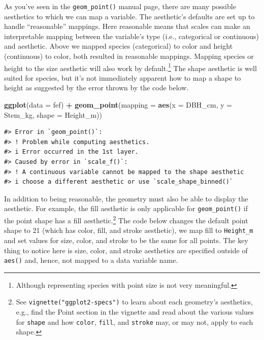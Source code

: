 \documentclass[
  11pt,
]{krantz}
\newenvironment{Shaded}{\begin{snugshade}}{\end{snugshade}}
\newcommand{\DataTypeTok}[1]{\textcolor[rgb]{0.13,0.29,0.53}{#1}}
\newcommand{\KeywordTok}[1]{\textcolor[rgb]{0.13,0.29,0.53}{\textbf{#1}}}
\newcommand{\NormalTok}[1]{#1}
\newcommand{\OperatorTok}[1]{\textcolor[rgb]{0.81,0.36,0.00}{\textbf{#1}}}
\newcommand{\StringTok}[1]{\textcolor[rgb]{0.31,0.60,0.02}{#1}}
\theoremstyle{definition}
\theoremstyle{definition}
\theoremstyle{definition}
\theoremstyle{definition}
\theoremstyle{remark}
\begin{document}
As you've seen in the \texttt{geom\_point()} manual page, there are many possible aesthetics to which we can map a variable. The aesthetic's defaults are set up to handle ``reasonable'' mappings. Here reasonable means that scales can make an interpretable mapping between the variable's type (i.e., categorical or continuous) and aesthetic. Above we mapped species (categorical) to color and height (continuous) to color, both resulted in reasonable mappings. Mapping species or height to the size aesthetic will also work by default.\footnote{Although representing species with point size is not very meaningful.} The shape aesthetic is well suited for species, but it's not immediately apparent how to map a shape to height as suggested by the error thrown by the code below.

\begin{Shaded}
\begin{Highlighting}[]
\KeywordTok{ggplot}\NormalTok{(}\DataTypeTok{data =}\NormalTok{ fef) }\OperatorTok{+}
\StringTok{  }\KeywordTok{geom\_point}\NormalTok{(}\DataTypeTok{mapping =} \KeywordTok{aes}\NormalTok{(}\DataTypeTok{x =}\NormalTok{ DBH\_cm, }\DataTypeTok{y =}\NormalTok{ Stem\_kg, }\DataTypeTok{shape =}\NormalTok{ Height\_m)) }
\end{Highlighting}
\end{Shaded}

\begin{verbatim}
#> Error in `geom_point()`:
#> ! Problem while computing aesthetics.
#> i Error occurred in the 1st layer.
#> Caused by error in `scale_f()`:
#> ! A continuous variable cannot be mapped to the shape aesthetic
#> i choose a different aesthetic or use `scale_shape_binned()`
\end{verbatim}

In addition to being reasonable, the geometry must also be able to display the aesthetic. For example, the fill aesthetic is only applicable for \texttt{geom\_point()} if the point shape has a fill aesthetic.\footnote{See \texttt{vignette("ggplot2-specs")} to learn about each geometry's aesthetics, e.g., find the Point section in the vignette and read about the various values for \texttt{shape} and how \texttt{color}, \texttt{fill}, and \texttt{stroke} may, or may not, apply to each shape.} The code below changes the default point shape to 21 (which has color, fill, and stroke aesthetic), we map fill to \texttt{Height\_m} and set values for size, color, and stroke to be the same for all points. The key thing to notice here is size, color, and stroke aesthetics are specified outside of \texttt{aes()} and, hence, not mapped to a data variable name.
\end{document}

